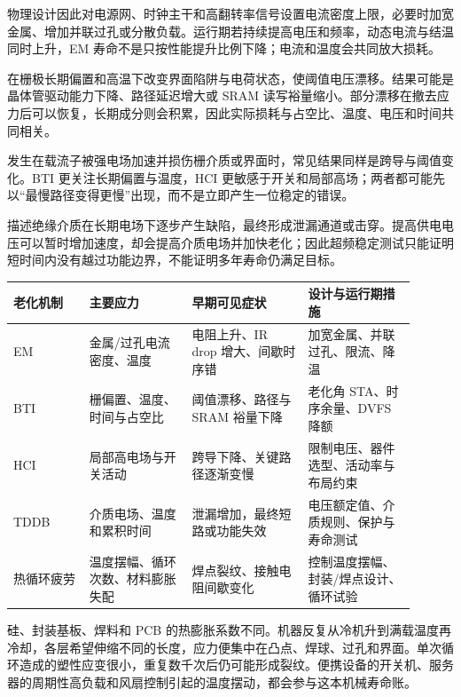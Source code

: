 物理设计因此对电源网、时钟主干和高翻转率信号设置电流密度上限，必要时加宽金属、增加并联过孔或分散负载。运行期若持续提高电压和频率，动态电流与结温同时上升，EM 寿命不是只按性能提升比例下降；电流和温度会共同放大损耗。


在栅极长期偏置和高温下改变界面陷阱与电荷状态，使阈值电压漂移。结果可能是晶体管驱动能力下降、路径延迟增大或 SRAM 读写裕量缩小。部分漂移在撤去应力后可以恢复，长期成分则会积累，因此实际损耗与占空比、温度、电压和时间共同相关。

发生在载流子被强电场加速并损伤栅介质或界面时，常见结果同样是跨导与阈值变化。BTI 更关注长期偏置与温度，HCI 更敏感于开关和局部高场；两者都可能先以“最慢路径变得更慢”出现，而不是立即产生一位稳定的错误。

描述绝缘介质在长期电场下逐步产生缺陷，最终形成泄漏通道或击穿。提高供电电压可以暂时增加速度，却会提高介质电场并加快老化；因此超频稳定测试只能证明短时间内没有越过功能边界，不能证明多年寿命仍满足目标。

\begin{longtable}{L{0.17\linewidth}L{0.23\linewidth}L{0.26\linewidth}L{0.24\linewidth}}
\toprule
老化机制 & 主要应力 & 早期可见症状 & 设计与运行期措施 \\
\midrule
EM & 金属/过孔电流密度、温度 & 电阻上升、IR drop 增大、间歇时序错 & 加宽金属、并联过孔、限流、降温 \\\tablerowrule
BTI & 栅偏置、温度、时间与占空比 & 阈值漂移、路径与 SRAM 裕量下降 & 老化角 STA、时序余量、DVFS 降额 \\\tablerowrule
HCI & 局部高电场与开关活动 & 跨导下降、关键路径逐渐变慢 & 限制电压、器件选型、活动率与布局约束 \\\tablerowrule
TDDB & 介质电场、温度和累积时间 & 泄漏增加，最终短路或功能失效 & 电压额定值、介质规则、保护与寿命测试 \\\tablerowrule
热循环疲劳 & 温度摆幅、循环次数、材料膨胀失配 & 焊点裂纹、接触电阻间歇变化 & 控制温度摆幅、封装/焊点设计、循环试验 \\
\bottomrule
\end{longtable}


硅、封装基板、焊料和 PCB 的热膨胀系数不同。机器反复从冷机升到满载温度再冷却，各层希望伸缩不同的长度，应力便集中在凸点、焊球、过孔和界面。单次循环造成的塑性应变很小，重复数千次后仍可能形成裂纹。便携设备的开关机、服务器的周期性高负载和风扇控制引起的温度摆动，都会参与这本机械寿命账。

